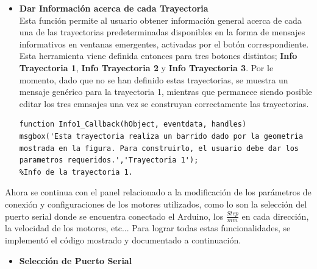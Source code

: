 \documentclass{article}
\begin{document}
\begin{multicols}{2}
\begin{itemize}
\begin{lstlisting}
    switch fun
    %Definir cada caso y la accion que se toma en cada uno.
        case 1
        %Se muestra en el eje de imagenes la imagen correspondiente a cada trayectoria.
            a = imread('A.png');
            imshow(a);
            %Se despliega la ventana emergente para ingresar los parametros de cada trayectoria.
            x=inputdlg({'Parametro A','Parametro B'},'Parametros');
            %x sera una celda de dos elementos.
            params=cell2mat(x);
            %params es un arreglo con estos valores. Posteriormente sera posible manipularlos para la creacion de la trayectoria.
        case 2
            b = imread('B.jpg');
            imshow(b);
        case 3
            c = imread('C.png');
            imshow(c);
                
    end
guidata(hObject,handles);
\end{lstlisting}
\item \textbf{Dar Información acerca de cada Trayectoria}\\
Esta función permite al usuario obtener información general acerca de cada una de las trayectorias predeterminadas disponibles en la forma de mensajes informativos en ventanas emergentes, activadas por el botón correspondiente. Esta herramienta viene definida entonces para tres botones distintos; \textbf{Info Trayectoria 1}, \textbf{Info Trayectoria 2} y \textbf{Info Trayectoria 3}. Por le momento, dado que no se han definido estas trayectorias, se muestra un mensaje genérico para la trayectoria 1, mientras que permanece siendo posible editar los tres emnsajes una vez se construyan correctamente las trayectorias.
\begin{lstlisting}
function Info1_Callback(hObject, eventdata, handles)
msgbox('Esta trayectoria realiza un barrido dado por la geometria mostrada en la figura. Para construirlo, el usuario debe dar los parametros requeridos.','Trayectoria 1');
%Info de la trayectoria 1.
\end{lstlisting}
\end{itemize}
Ahora se continua con el panel relacionado a la modificación de los parámetros de conexión y configuraciones de los motores utilizados, como lo son la selección del puerto serial donde se encuentra conectado el Arduino, los $\frac{Step}{mm}$ en cada dirección, la velocidad de los motores, etc... Para lograr todas estas funcionalidades, se implementó el código mostrado y documentado a continuación.
\begin{itemize}
\item \textbf{Selección de Puerto Serial}\\

\end{itemize}
\end{multicols}
\end{document}
